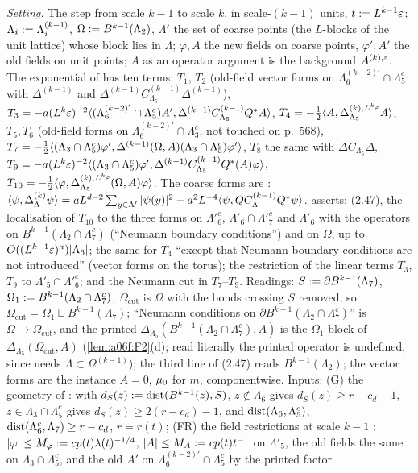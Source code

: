 \emph{Setting.} The step from scale $k-1$ to scale $k$, in scale-$(k-1)$ units, $t:= L^{k-1}\varepsilon$; $\Lambda_i:=\Lambda^{(k-1)}_i$, $\Omega:= B^{k-1}(\Lambda_2)$, $\Lambda'$ the set of coarse points (the $L$-blocks of the unit lattice) whose block lies in $\Lambda$; $\varphi,A$ the new fields on coarse points, $\varphi',A'$ the old fields on unit points; $A$ as an operator argument is the background $A^{(k),\varepsilon}$. The exponential of \cite[(2.46)]{Ba2} has ten terms: $T_1$, $T_2$ (old-field vector forms on $\Lambda^{(k-2)'}_6\cap\Lambda_5^c$ with $\Delta^{(k-1)}$ and $\Delta^{(k-1)}C^{(k-1)}_{\Lambda_5}\Delta^{(k-1)}$), $T_3=-a(L^k\varepsilon)^{-2}\langle (\Lambda^{(k-2)'}_6\cap\Lambda_5^c)A',\Delta^{(k-1)}C^{(k-1)}_{\Lambda_5}Q^*A\rangle$, $T_4=-\frac12\langle A,\Delta^{(k),L^k\varepsilon}_{\Lambda_5}A\rangle$, $T_5,T_6$ (old-field forms on $\Lambda^{(k-2)'}_6\cap\Lambda_3^c$, not touched on p.~568), $T_7=-\frac12\langle (\Lambda_3\cap\Lambda_5^c)\varphi',\Delta^{(k-1)}(\Omega,A)(\Lambda_3\cap\Lambda_5^c)\varphi'\rangle$, $T_8$ the same with $\Delta C_{\Lambda_5}\Delta$, $T_9=-a(L^k\varepsilon)^{-2}\langle (\Lambda_3\cap\Lambda_5^c)\varphi',\Delta^{(k-1)}C^{(k-1)}_{\Lambda_5}Q^*(A)\varphi\rangle$, $T_{10}=-\frac12\langle \varphi,\Delta^{(k),L^k\varepsilon}_{\Lambda_5}(\Omega,A)\varphi\rangle$. The coarse forms are \cite[(2.27)]{Ba2}: $\langle \psi,\Delta^{(k)}_\Lambda\psi\rangle=aL^{d-2}\sum_{y\in\Lambda'}|\psi(y)|^2-a^2L^{-4}\langle \psi,QC^{(k-1)}_\Lambda Q^*\psi\rangle$. \cite[p.~568]{Ba2} asserts: (2.47), the localisation of $T_{10}$ to the three forms on $\Lambda'^c_6$, $\Lambda'_6\cap\Lambda'^c_7$ and $\Lambda'_6$ with the operators on $B^{k-1}(\Lambda_2\cap\Lambda_7^c)$ (``Neumann boundary conditions'') and on $\Omega$, up to $O((L^{k-1}\varepsilon)^\kappa)|\Lambda_6|$; the same for $T_4$ ``except that Neumann boundary conditions are not introduced'' (vector forms on the torus); the restriction of the linear terms $T_3$, $T_9$ to $\Lambda'_5\cap\Lambda'^c_6$; and the Neumann cut in $T_7$--$T_9$. Readings: $S:=\partial B^{k-1}(\Lambda_7)$, $\Omega_1:= B^{k-1}(\Lambda_2\cap\Lambda_7^c)$, $\Omega_{\mathrm{cut}}$ is $\Omega$ with the bonds crossing $S$ removed, so $\Omega_{\mathrm{cut}}=\Omega_1\sqcup B^{k-1}(\Lambda_7)$; ``Neumann conditions on $\partial B^{k-1}(\Lambda_2\cap\Lambda_7^c)$'' is $\Omega\to\Omega_{\mathrm{cut}}$, and the printed $\Delta_{\Lambda_5}(B^{k-1}(\Lambda_2\cap\Lambda_7^c),A)$ is the $\Omega_1$-block of $\Delta_{\Lambda_5}(\Omega_{\mathrm{cut}},A)$ (\cref{lem:a06f:F2}(d); read literally the printed operator is undefined, since \cite[(2.27)]{Ba2} needs $\Lambda\subset\Omega^{(k-1)}$); the third line of (2.47) reads $B^{k-1}(\Lambda_2)$; the vector forms are the instance $A=0$, $\mu_0$ for $m$, componentwise. Inputs: (G) the geometry of \cite[(2.7)--(2.8)]{Ba2}: with $d_S(z):=\operatorname{dist}(B^{k-1}(z),S)$, $z\notin\Lambda_6$ gives $d_S(z)\ge r-c_d-1$, $z\in\Lambda_3\cap\Lambda_5^c$ gives $d_S(z)\ge2(r-c_d)-1$, and $\operatorname{dist}(\Lambda_6,\Lambda_5^c)$, $\operatorname{dist}(\Lambda_6^c,\Lambda_7)\ge r-c_d$, $r=r(t)$; (FR) the field restrictions \cite[(2.16)--(2.17)]{Ba2} at scale $k-1$ \cite[p.~560]{Ba2}: $|\varphi|\le M_\varphi:= cp(t)\lambda(t)^{-1/4}$, $|A|\le M_A:= cp(t)t^{-1}$ on $\Lambda'_5$, the old fields the same on $\Lambda_3\cap\Lambda_5^c$, and the old $A'$ on $\Lambda^{(k-2)'}_6\cap\Lambda_5^c$ by the printed factor 